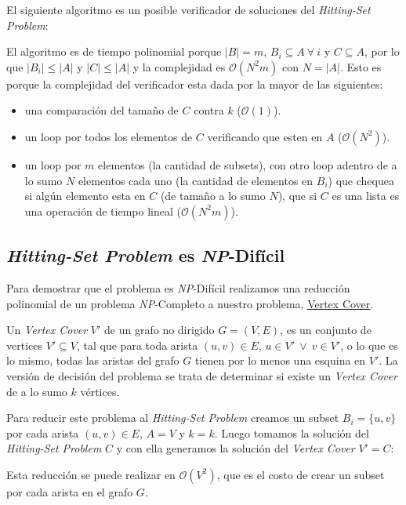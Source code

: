 El siguiente algoritmo es un posible verificador de soluciones del
\textit{Hitting-Set Problem}:



El algoritmo es de tiempo polinomial porque $|B| = m$, $B_i \subseteq A \
\forall \ i$ y $C \subseteq A$, por lo que $|B_i| \le |A|$ y $|C| \le |A|$ y la
complejidad es $\mathcal{O}(N^2m)$ con $N = |A|$. Esto es porque la complejidad
del verificador esta dada por la mayor de las siguientes:

\begin{itemize}
    \item una comparación del tamaño de $C$ contra $k$ ($\mathcal{O}(1)$).

    \item un loop por todos los elementos de $C$ verificando que esten en $A$
    ($\mathcal{O}(N^2)$).

    \item un loop por $m$ elementos (la cantidad de subsets), con otro loop
    adentro de a lo sumo $N$ elementos cada uno (la cantidad de elementos en
    $B_i$) que chequea si algún elemento esta en $C$ (de tamaño a lo sumo $N$),
    que si $C$ es una lista es una operación de tiempo lineal
    ($\mathcal{O}(N^2m)$).
\end{itemize}

\subsection{\textit{Hitting-Set Problem} es \textit{NP}-Difícil}

Para demostrar que el problema es \textit{NP}-Difícil realizamos una reducción
polinomial de un problema \textit{NP}-Completo a nuestro problema,
\href{https://en.wikipedia.org/wiki/Vertex_cover}{\underline{Vertex Cover}}.

Un \textit{Vertex Cover} $V'$ de un grafo no dirigido $G = (V, E)$, es un
conjunto de vertices $V' \subseteq V$, tal que para toda arista $(u, v) \in E$,
$u \in V'\ \lor\ v \in V'$, o lo que es lo mismo, todas las aristas del grafo
$G$ tienen por lo menos una esquina en $V'$. La versión de decisión del
problema se trata de determinar si existe un \textit{Vertex Cover} de a lo sumo
$k$ vértices.

Para reducir este problema al \textit{Hitting-Set Problem} creamos un subset
$B_i = \{ u, v \}$ por cada arista $(u, v) \in E$, $A = V$ y $k = k$. Luego
tomamos la solución del \textit{Hitting-Set Problem} $C$ y con ella generamos
la solución del \textit{Vertex Cover} $V' = C$:



Esta reducción se puede realizar en $\mathcal{O}(V^2)$, que es el costo de
crear un subset por cada arista en el grafo $G$.
